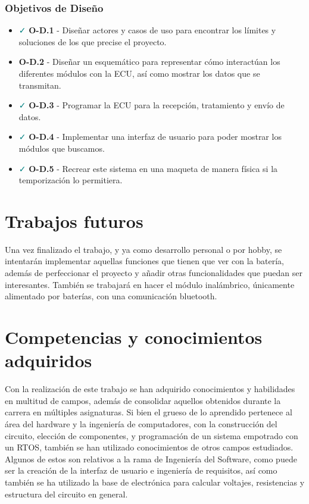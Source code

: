 \subsubsection*{Objetivos de Diseño}
\begin{itemize}
    \item \textcolor{teal}{\faCheck}  \textbf{O-D.1} - Diseñar actores y casos de uso para encontrar los límites y soluciones de los que precise el proyecto.
    \item \textcolor{red}{\faRemove}  \textbf{O-D.2} - Diseñar un esquemático para representar cómo interactúan los diferentes módulos con la ECU, así como mostrar los datos que se transmitan.
    \item \textcolor{teal}{\faCheck}  \textbf{O-D.3} - Programar la ECU para la recepción, tratamiento y envío de datos.
    \item \textcolor{teal}{\faCheck}  \textbf{O-D.4} - Implementar una interfaz de usuario para poder mostrar los módulos que buscamos.
    \item \textcolor{teal}{\faCheck}  \textbf{O-D.5} - Recrear este sistema en una maqueta de manera física si la temporización lo permitiera.
\end{itemize}

\section{Trabajos futuros}

Una vez finalizado el trabajo, y ya como desarrollo personal o por hobby, se intentarán implementar aquellas funciones que tienen que ver con la batería, además de perfeccionar el proyecto y añadir otras funcionalidades que puedan ser interesantes. También se trabajará en hacer el módulo inalámbrico, únicamente alimentado por baterías, con una comunicación bluetooth. 

\section{Competencias y conocimientos adquiridos}

Con la realización de este trabajo se han adquirido conocimientos y habilidades en multitud de campos, además de consolidar aquellos obtenidos durante la carrera en múltiples asignaturas. Si bien el grueso de lo aprendido pertenece al área del hardware y la ingeniería de computadores, con la construcción del circuito, elección de componentes, y programación de un sistema empotrado con un RTOS, también se han utilizado conocimientos de otros campos estudiados. Algunos de estos son relativos a la rama de Ingeniería del Software, como puede ser la creación de la interfaz de usuario e ingeniería de requisitos, así como también se ha utilizado la base de electrónica para calcular voltajes, resistencias y estructura del circuito en general. 

